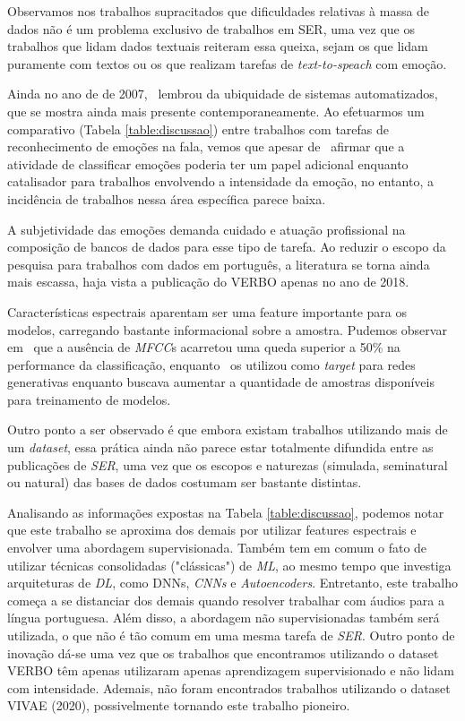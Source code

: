 Observamos nos trabalhos supracitados que dificuldades relativas à massa de dados não é um problema exclusivo de trabalhos em SER, uma vez que os trabalhos que lidam dados textuais reiteram essa queixa, sejam os que lidam puramente com textos ou os que realizam tarefas de \textit{text-to-speach} com emoção.

Ainda no ano de de 2007,~\cite{32.32} lembrou da ubiquidade de sistemas automatizados, que se mostra ainda mais presente contemporaneamente. Ao efetuarmos um comparativo (Tabela \ref{table:discussao}) entre trabalhos com tarefas de reconhecimento de emoções na fala, vemos que apesar de~\cite{14} afirmar que a atividade de classificar emoções poderia ter um papel adicional enquanto catalisador para trabalhos envolvendo a intensidade da emoção, no entanto, a incidência de trabalhos nessa área específica parece baixa.

A subjetividade das emoções demanda cuidado e atuação profissional na composição de bancos de dados para esse tipo de tarefa. Ao reduzir o escopo da pesquisa para trabalhos com dados em português, a literatura se torna ainda mais escassa, haja vista a publicação do VERBO apenas no ano de 2018.

Características espectrais aparentam ser uma feature importante para os modelos, carregando bastante informacional sobre a amostra. Pudemos observar em~\cite{11} que a ausência de \textit{MFCC}s acarretou uma queda superior a 50\% na performance da classificação, enquanto~\cite{34} os utilizou como \textit{target} para redes generativas enquanto buscava aumentar a quantidade de amostras disponíveis para treinamento de modelos.

Outro ponto a ser observado é que embora existam trabalhos utilizando mais de um \textit{dataset}, essa prática ainda não parece estar totalmente difundida entre as publicações de \textit{SER}, uma vez que os escopos e naturezas (simulada, seminatural ou natural) das bases de dados costumam ser bastante distintas.

Analisando as informações expostas na Tabela \ref{table:discussao}, podemos notar que este trabalho se aproxima dos demais por utilizar features espectrais e envolver uma abordagem supervisionada. Também tem em comum o fato de utilizar técnicas consolidadas ("clássicas") de \textit{ML}, ao mesmo tempo que investiga arquiteturas de \textit{DL}, como DNNs, \textit{CNNs} e \textit{Autoencoders}. Entretanto, este trabalho começa a se distanciar dos demais quando resolver trabalhar com áudios para a língua portuguesa. Além disso, a abordagem não supervisionadas também será utilizada, o que não é tão comum em uma mesma tarefa de \textit{SER}. Outro ponto de inovação dá-se uma vez que os trabalhos que encontramos utilizando o dataset VERBO têm apenas utilizaram apenas aprendizagem supervisionado e não lidam com intensidade. Ademais, não foram encontrados trabalhos utilizando o dataset VIVAE (2020), possivelmente tornando este trabalho pioneiro.

